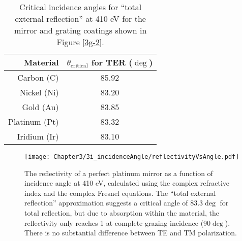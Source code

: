 \begin{table}[p]
   \centering
   \caption{Critical incidence angles for ``total external reflection'' at 410 eV for the mirror and grating coatings shown in Figure \ref{3g-2}.}
   \begin{tabular}{@{} r c @{}} %
      \hline
        Material    & $\theta_{\mathrm{critical}}$ for TER ($\deg$)\\
      \hline \hline
Carbon (C) & 85.92\\
Nickel (Ni) & 83.20\\
Gold (Au)& 83.85\\
Platinum (Pt)& 83.32\\
Iridium (Ir)& 83.10\\
      \hline
   \end{tabular}
   \label{3i-2}
\end{table}

\begin{figure}[p] %
   \centering
   \texttt{[image: Chapter3/3i\_incidenceAngle/reflectivityVsAngle.pdf]} 
   \caption{The reflectivity of a perfect platinum mirror as a function of incidence angle at 410 eV, calculated using the complex refractive index and the complex Fresnel equations.  The ``total external reflection'' approximation suggests a critical angle of 83.3$\deg$ for total reflection, but due to absorption within the material, the reflectivity only reaches 1 at complete grazing incidence (90$\deg$).  There is no substantial difference between TE and TM polarization.}
   \label{reflectionVsAngle}
\end{figure}


